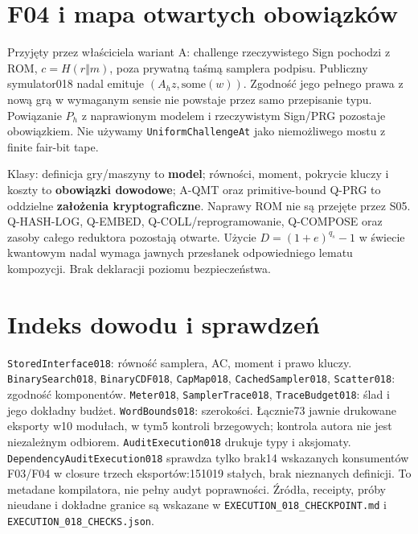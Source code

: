 \documentclass[11pt,a4paper]{article}
\newcommand{\code}[1]{\nolinkurl{#1}}
\begin{document}
\section{F04 i mapa otwartych obowiązków}
Przyjęty przez właściciela wariant A: challenge rzeczywistego Sign
pochodzi z ROM, $c=H(r\Vert m)$, poza prywatną taśmą samplera podpisu.
Publiczny symulator018 nadal emituje $(A_hz,\mathrm{some}(w))$.
Zgodność jego pełnego prawa z nową grą w wymaganym sensie nie powstaje
przez samo przepisanie typu. Powiązanie $P_h$ z naprawionym modelem i
rzeczywistym Sign/PRG pozostaje obowiązkiem. Nie używamy
\code{UniformChallengeAt} jako niemożliwego mostu z finite fair-bit tape.

Klasy: definicja gry/maszyny to \textbf{model}; równości, moment, pokrycie
kluczy i koszty to \textbf{obowiązki dowodowe}; A-QMT oraz primitive-bound
Q-PRG to oddzielne \textbf{założenia kryptograficzne}. Naprawy ROM nie są
przejęte przez S05. Q-HASH-LOG, Q-EMBED, Q-COLL/reprogramowanie, Q-COMPOSE
oraz zasoby całego reduktora pozostają otwarte. Użycie
$D=(1+e)^{q_s}-1$ w świecie kwantowym nadal wymaga jawnych przesłanek
odpowiedniego lematu kompozycji. Brak deklaracji poziomu bezpieczeństwa.

\section{Indeks dowodu i sprawdzeń}
\code{StoredInterface018}: równość samplera, AC, moment i prawo kluczy.
\code{BinarySearch018}, \code{BinaryCDF018}, \code{CapMap018},
\code{CachedSampler018}, \code{Scatter018}: zgodność komponentów.
\code{Meter018}, \code{SamplerTrace018}, \code{TraceBudget018}:
ślad i jego dokładny budżet. \code{WordBounds018}: szerokości.
Łącznie73 jawnie drukowane eksporty w10 modułach, w tym5 kontroli
brzegowych; kontrola autora nie jest niezależnym odbiorem.
\code{AuditExecution018} drukuje typy i aksjomaty.
\code{DependencyAuditExecution018} sprawdza tylko brak14 wskazanych
konsumentów F03/F04 w closure trzech eksportów:151019 stałych, brak
nieznanych definicji. To metadane kompilatora, nie pełny audyt poprawności.
Źródła, receipty, próby nieudane i dokładne granice są wskazane w
\code{EXECUTION_018_CHECKPOINT.md} i \code{EXECUTION_018_CHECKS.json}.
\end{document}
